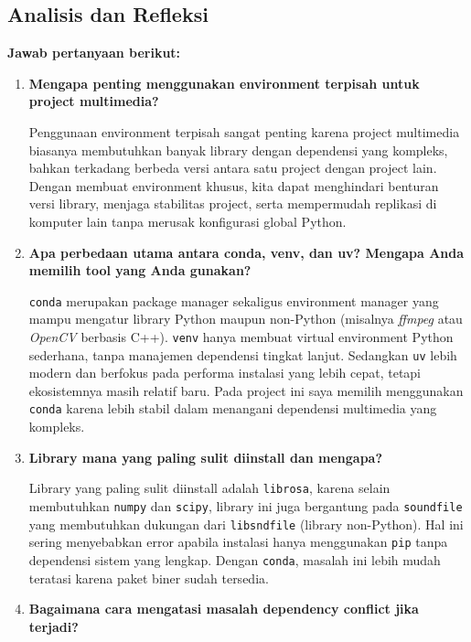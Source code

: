\documentclass[11pt,a4paper]{article}
\begin{document}
\subsection{Analisis dan Refleksi}
\textbf{Jawab pertanyaan berikut:}

\begin{enumerate}
    \item \textbf{Mengapa penting menggunakan environment terpisah untuk project multimedia?}
    
    Penggunaan environment terpisah sangat penting karena project multimedia biasanya membutuhkan banyak library dengan dependensi yang kompleks, bahkan terkadang berbeda versi antara satu project dengan project lain. Dengan membuat environment khusus, kita dapat menghindari benturan versi library, menjaga stabilitas project, serta mempermudah replikasi di komputer lain tanpa merusak konfigurasi global Python.
    
    \item \textbf{Apa perbedaan utama antara conda, venv, dan uv? Mengapa Anda memilih tool yang Anda gunakan?}
    
    \texttt{conda} merupakan package manager sekaligus environment manager yang mampu mengatur library Python maupun non-Python (misalnya \textit{ffmpeg} atau \textit{OpenCV} berbasis C++). \texttt{venv} hanya membuat virtual environment Python sederhana, tanpa manajemen dependensi tingkat lanjut. Sedangkan \texttt{uv} lebih modern dan berfokus pada performa instalasi yang lebih cepat, tetapi ekosistemnya masih relatif baru. Pada project ini saya memilih menggunakan \texttt{conda} karena lebih stabil dalam menangani dependensi multimedia yang kompleks.
    
    \item \textbf{Library mana yang paling sulit diinstall dan mengapa?}
    
    Library yang paling sulit diinstall adalah \texttt{librosa}, karena selain membutuhkan \texttt{numpy} dan \texttt{scipy}, library ini juga bergantung pada \texttt{soundfile} yang membutuhkan dukungan dari \texttt{libsndfile} (library non-Python). Hal ini sering menyebabkan error apabila instalasi hanya menggunakan \texttt{pip} tanpa dependensi sistem yang lengkap. Dengan \texttt{conda}, masalah ini lebih mudah teratasi karena paket biner sudah tersedia.
    
    \item \textbf{Bagaimana cara mengatasi masalah dependency conflict jika terjadi?}
    

\end{enumerate}
\end{document}
